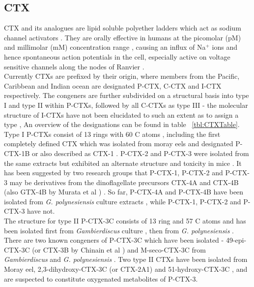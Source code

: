 \documentclass[12pt]{article}
\begin{document}
\subsection{CTX}
CTX and its analogues are lipid soluble polyether ladders which act as sodium channel activators \cite{dechraoui1999ciguatoxins}. They are orally effective in humans at the picomolar (pM) and millimolar (mM) concentration range \cite{molgo2000ciguatera}, causing an influx of Na$^{+}$ ions and hence spontaneous action potentials in the cell, especially active on voltage sensitive channels along the nodes of Ranvier \cite{sims1987theoretical,mattei1999neurotoxins,lewis1992action,molgo2000ciguatera}. \\
Currently CTXs are prefixed by their origin, where members from the Pacific, Caribbean and Indian ocean are designated P-CTX, C-CTX and I-CTX respectively. %
The congeners are further subdivided on a structural basis into type I and type II within P-CTXs, followed by all C-CTXs as type III - the molecular structure of I-CTXs have not been elucidated to such an extent as to assign a type \cite{legrand1997two,hamilton2002multiple,hamilton2002isolation}, An overview of the designations can be found in table ~\ref{tbl:CTXTable}.  \\
Type I P-CTXs consist of 13 rings with 60 C atoms \cite{murata1990structures,lewis1991purification,lewis1993origin}, including the first completely defined CTX which was isolated from moray eels and designated P-CTX-1B \cite{murata1990structures} or also described as CTX-1 \cite{lewis1991purification}. P-CTX-2 and P-CTX-3 were isolated from the same extracts but exhibited an alternate structure and toxicity in mice \cite{lewis1991purification}. It has been suggested by two research groups that P-CTX-1, P-CTX-2 and P-CTX-3 may be derivatives from the dinoflagellate precursors CTX-4A and CTX-4B (also GTX-4B by Murata et al \cite{murata1990structures}) \cite{lewis1993origin,yasumoto2000structural}. So far, P-CTX-4A and P-CTX-4B have been isolated from \emph{G. polynesiensis} culture extracts \cite{chinain2010growth}, while P-CTX-1, P-CTX-2 and P-CTX-3 have not. \\
The structure for type II P-CTX-3C consists of 13 ring and 57 C atoms and has been isolated first from \emph{Gambierdiscus} culture \cite{satake1993structure}, then from \emph{G. polynesiensis} \cite{chinain2010growth}. There are two known congeners of P-CTX-3C which have been isolated - 49-epi-CTX-3C (or CTX-3B by Chinain et al \cite{chinain2010growth}) and M-seco-CTX-3C from \emph{Gambierdiscus} \cite{satake1993structure} and \emph{G. polynesiensis} \cite{chinain2010growth}. Two type II CTXs have been isolated from Moray eel, 2,3-dihydroxy-CTX-3C (or CTX-2A1) and 51-hydroxy-CTX-3C \cite{satake1998isolation}, and are suspected to constitute oxygenated metabolites of P-CTX-3. \\ %
\end{document}

